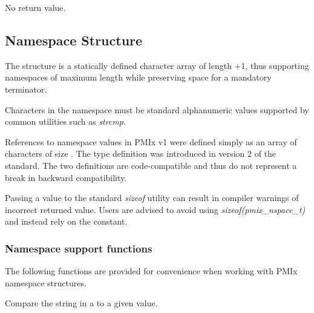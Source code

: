 \begin{arglist}
\end{arglist}

No return value.

\subsection{Namespace Structure}

The  structure is a statically defined character array of length +1, thus supporting namespaces of maximum length  while preserving space for a mandatory  terminator.


Characters in the namespace must be standard alphanumeric values supported by common utilities such as \textit{strcmp}.

\adviceuserstart
References to namespace values in \ac{PMIx} v1 were defined simply as an array of characters of size . The  type definition was introduced in version 2 of the standard. The two definitions are code-compatible and thus do not represent a break in backward compatibility.

Passing a  value to the standard \textit{sizeof} utility can result in compiler warnings of incorrect returned value. Users are advised to avoid using \textit{sizeof(pmix_nspace_t)} and instead rely on the  constant.
\adviceuserend

\subsubsection{Namespace support functions}

The following functions are provided for convenience when working with \ac{PMIx} namespace structures.


\summary

Compare the string in a  to a given value.

